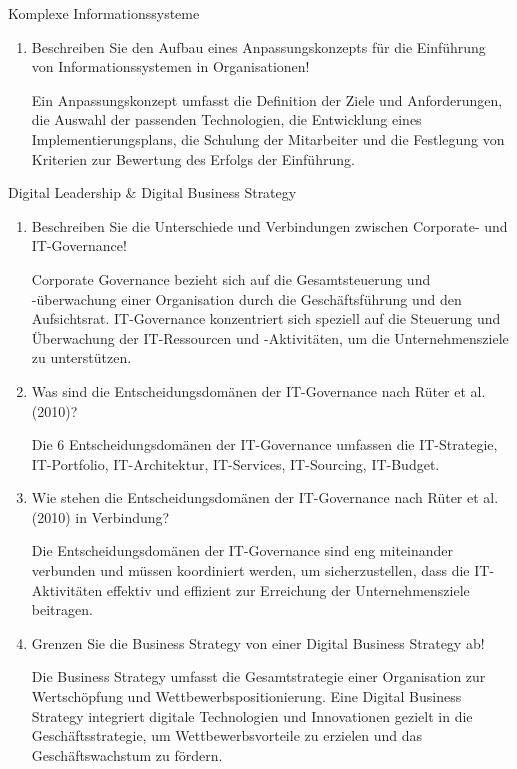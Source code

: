 \documentclass{article}
\begin{document}
\begin{exercise}{Komplexe Informationssysteme}
\begin{enumerate}
    \item Beschreiben Sie den Aufbau eines Anpassungskonzepts für die Einführung von Informationssystemen in Organisationen!
          \begin{solution}
            Ein Anpassungskonzept umfasst die Definition der Ziele und Anforderungen, die Auswahl der passenden Technologien, die Entwicklung eines Implementierungsplans, die Schulung der Mitarbeiter und die Festlegung von Kriterien zur Bewertung des Erfolgs der Einführung.
          \end{solution}
  \end{enumerate}
\end{exercise}

\begin{exercise}{Digital Leadership \& Digital Business Strategy}
  \begin{enumerate}
    \item Beschreiben Sie die Unterschiede und Verbindungen zwischen Corporate- und IT-Governance!
          \begin{solution}
            Corporate Governance bezieht sich auf die Gesamtsteuerung und -überwachung einer Organisation durch die Geschäftsführung und den Aufsichtsrat. IT-Governance konzentriert sich speziell auf die Steuerung und Überwachung der IT-Ressourcen und -Aktivitäten, um die Unternehmensziele zu unterstützen.
          \end{solution}

    \item Was sind die Entscheidungsdomänen der IT-Governance nach Rüter et al. (2010)?
          \begin{solution}
            Die 6 Entscheidungsdomänen der IT-Governance umfassen die IT-Strategie, IT-Portfolio, IT-Architektur, IT-Services, IT-Sourcing, IT-Budget.
          \end{solution}

    \item Wie stehen die Entscheidungsdomänen der IT-Governance nach Rüter et al. (2010) in Verbindung?
          \begin{solution}
            Die Entscheidungsdomänen der IT-Governance sind eng miteinander verbunden und müssen koordiniert werden, um sicherzustellen, dass die IT-Aktivitäten effektiv und effizient zur Erreichung der Unternehmensziele beitragen.
          \end{solution}

    \item Grenzen Sie die Business Strategy von einer Digital Business Strategy ab!
          \begin{solution}
            Die Business Strategy umfasst die Gesamtstrategie einer Organisation zur Wertschöpfung und Wettbewerbspositionierung. Eine Digital Business Strategy integriert digitale Technologien und Innovationen gezielt in die Geschäftsstrategie, um Wettbewerbsvorteile zu erzielen und das Geschäftswachstum zu fördern.
          \end{solution}


\end{enumerate}
\end{exercise}
\end{document}

